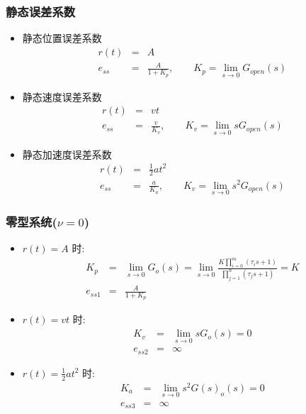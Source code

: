 \documentclass{article}
\begin{document}
\begin{frame}
\frametitle{静态误差系数}
\label{sec-3-2-5}

\begin{itemize}
\item <2->静态位置误差系数
       	\begin{eqnarray*}
       	r(t) &=& A\\
       	e_{ss}&=&\frac{A}{1+K_{p}}, \qquad
       	K_{p}=\lim_{s\rightarrow 0} G_{open}(s)
       	\end{eqnarray*}
\item <3->静态速度误差系数 
       	\begin{eqnarray*}
       	r(t)&=&vt\\
       	e_{ss}&=&\frac{v}{K_{v}}, \qquad
       	K_{v}=\lim_{s\rightarrow 0} sG_{open}(s)
       	\end{eqnarray*}
\item <4->静态加速度误差系数 
       	\begin{eqnarray*}
       	r(t)&=&\frac{1}{2}at^{2}\\
       	e_{ss}&=&\frac{a}{K_{a}}, \qquad
       	K_{v}=\lim_{s\rightarrow 0} s^{2}G_{open}(s)
       	\end{eqnarray*}
\end{itemize}
\end{frame}
\begin{frame}
\frametitle{零型系统($\nu=0$)}
\label{sec-3-2-6}

\begin{itemize}
\item <2-> $r(t)=A$ 时:
      \begin{eqnarray*}
      K_p &=& \lim_{s\rightarrow 0}G_o(s) 
	  = \lim_{s\rightarrow 0}\frac{K\prod_{i=0}^m(\tau_i s+1)}{\prod_{j=1}^n (\tau_j s+1)} 
	  = K \\
      e_{ss1} &=& \frac{A}{1+K_p}
      \end{eqnarray*}
\item <3-> $r(t)=vt$ 时:
      \begin{eqnarray*}
      K_v &=& \lim_{s\rightarrow 0}sG_o(s) 
	  = 0 \\
      e_{ss2} &=& \infty 
      \end{eqnarray*}
\item <4> $r(t)=\frac{1}{2}at^2$ 时:
      \begin{eqnarray*}
      K_a &=& \lim_{s\rightarrow 0}s^2 G(s)_o(s) 
	  = 0 \\
      e_{ss3} &=& \infty
      \end{eqnarray*}
\end{itemize}
\end{frame}
\end{document}
